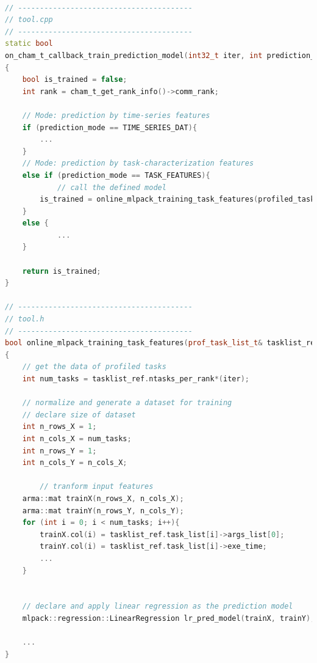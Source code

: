 


\begin{lstlisting}[language=C++, caption={A snippet code for implementing a prediction model in the callback tool with Chameleon.}, label={lst:cham_mxm_prediction_tool_code}]

// ----------------------------------------
// tool.cpp
// ----------------------------------------
static bool
on_cham_t_callback_train_prediction_model(int32_t iter, int prediction_mode)
{
    bool is_trained = false;
    int rank = cham_t_get_rank_info()->comm_rank;

    // Mode: prediction by time-series features
    if (prediction_mode == TIME_SERIES_DAT){
        ...
    }
    // Mode: prediction by task-characterization features
    else if (prediction_mode == TASK_FEATURES){
    		// call the defined model
        is_trained = online_mlpack_training_task_features(profiled_task_list, iter);
    }
    else {
    		...
    }

    return is_trained;
}

// ----------------------------------------
// tool.h
// ----------------------------------------
bool online_mlpack_training_task_features(prof_task_list_t& tasklist_ref, int iter)
{
    // get the data of profiled tasks
    int num_tasks = tasklist_ref.ntasks_per_rank*(iter);

    // normalize and generate a dataset for training
    // declare size of dataset
    int n_rows_X = 1;
    int n_cols_X = num_tasks;
    int n_rows_Y = 1;
    int n_cols_Y = n_cols_X;

		// tranform input features
    arma::mat trainX(n_rows_X, n_cols_X);
    arma::mat trainY(n_rows_Y, n_cols_Y);
    for (int i = 0; i < num_tasks; i++){
        trainX.col(i) = tasklist_ref.task_list[i]->args_list[0];
        trainY.col(i) = tasklist_ref.task_list[i]->exe_time;
        ...
    }


    // declare and apply linear regression as the prediction model
    mlpack::regression::LinearRegression lr_pred_model(trainX, trainY);

    ...
}
\end{lstlisting}
\hfill

